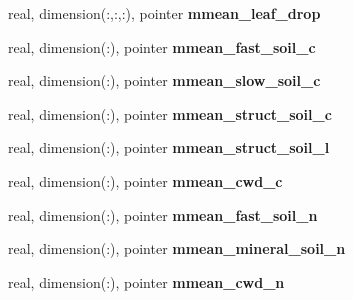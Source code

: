 \begin{DoxyCompactItemize}
\item 
\hypertarget{structed__state__vars_1_1edtype_a90912042f200584a7e2712d89e6a5229}{
real, dimension(:,:,:), pointer {\bfseries mmean\_\-leaf\_\-drop}}
\label{structed__state__vars_1_1edtype_a90912042f200584a7e2712d89e6a5229}

\item 
\hypertarget{structed__state__vars_1_1edtype_a4547159a5d96ac2fcc686813bbf4a26e}{
real, dimension(:), pointer {\bfseries mmean\_\-fast\_\-soil\_\-c}}
\label{structed__state__vars_1_1edtype_a4547159a5d96ac2fcc686813bbf4a26e}

\item 
\hypertarget{structed__state__vars_1_1edtype_a573a4050d81898038eaf38a9dcaf8354}{
real, dimension(:), pointer {\bfseries mmean\_\-slow\_\-soil\_\-c}}
\label{structed__state__vars_1_1edtype_a573a4050d81898038eaf38a9dcaf8354}

\item 
\hypertarget{structed__state__vars_1_1edtype_a5f5657027ce639bc9f9a7d0d8817ff63}{
real, dimension(:), pointer {\bfseries mmean\_\-struct\_\-soil\_\-c}}
\label{structed__state__vars_1_1edtype_a5f5657027ce639bc9f9a7d0d8817ff63}

\item 
\hypertarget{structed__state__vars_1_1edtype_a22d7caa62de52daefb2d9c44cb6e2b5b}{
real, dimension(:), pointer {\bfseries mmean\_\-struct\_\-soil\_\-l}}
\label{structed__state__vars_1_1edtype_a22d7caa62de52daefb2d9c44cb6e2b5b}

\item 
\hypertarget{structed__state__vars_1_1edtype_ae9119414b7bd2f8ad1e6b5ff0f4c27dc}{
real, dimension(:), pointer {\bfseries mmean\_\-cwd\_\-c}}
\label{structed__state__vars_1_1edtype_ae9119414b7bd2f8ad1e6b5ff0f4c27dc}

\item 
\hypertarget{structed__state__vars_1_1edtype_a614f7bc0c1768f44cd8f0343b48d774d}{
real, dimension(:), pointer {\bfseries mmean\_\-fast\_\-soil\_\-n}}
\label{structed__state__vars_1_1edtype_a614f7bc0c1768f44cd8f0343b48d774d}

\item 
\hypertarget{structed__state__vars_1_1edtype_a7a7ccfdfdf088d9b5e1ecb8f7a7934d3}{
real, dimension(:), pointer {\bfseries mmean\_\-mineral\_\-soil\_\-n}}
\label{structed__state__vars_1_1edtype_a7a7ccfdfdf088d9b5e1ecb8f7a7934d3}

\item 
\hypertarget{structed__state__vars_1_1edtype_a47febb5e5fabed81dc4959b67c2a0375}{
real, dimension(:), pointer {\bfseries mmean\_\-cwd\_\-n}}
\label{structed__state__vars_1_1edtype_a47febb5e5fabed81dc4959b67c2a0375}


\end{DoxyCompactItemize}
